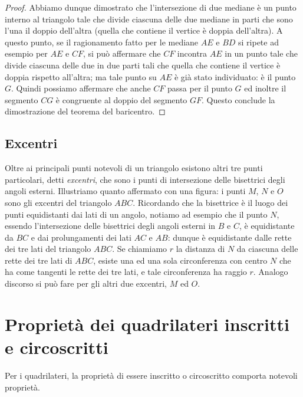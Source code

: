 \begin{proof}
Abbiamo dunque dimostrato che l'intersezione di due mediane è un punto interno al triangolo tale che divide ciascuna delle due mediane in parti che sono l'una il doppio dell'altra (quella che contiene il vertice è doppia dell'altra).
A questo punto, se il ragionamento fatto per le mediane $AE$ e $BD$ si ripete ad esempio per $AE$ e $CF$, si può affermare che $CF$ incontra $AE$ in un punto tale che divide ciascuna delle due in due parti tali che quella che contiene il vertice è doppia rispetto all'altra; ma tale punto su $AE$ è già stato individuato: è il punto $G$. Quindi possiamo affermare che anche $CF$ passa per il punto $G$ ed inoltre il segmento $CG$ è congruente al doppio del segmento $GF$. Questo conclude la dimostrazione del teorema del baricentro.
\end{proof}

\subsection{Excentri}

Oltre ai principali punti notevoli di un triangolo esistono altri tre punti particolari, detti \emph{excentri}, che sono i punti di intersezione delle bisettrici degli angoli esterni. Illustriamo quanto affermato con una figura: i punti $M$, $N$ e $O$ sono gli excentri del triangolo $ABC$. Ricordando che la bisettrice è il luogo dei punti equidistanti dai lati di un angolo, notiamo ad esempio che il punto $N$, essendo l'intersezione delle bisettrici degli angoli esterni in $B$ e $C$, è equidistante da $BC$ e dai prolungamenti dei lati $AC$ e $AB$: dunque è equidistante dalle rette dei tre lati del triangolo $ABC$. Se chiamiamo $r$ la distanza di $N$ da ciascuna delle rette dei tre lati di $ABC$, esiste una ed una sola circonferenza con centro $N$ che ha come tangenti le rette dei tre lati, e tale circonferenza ha raggio $r$. Analogo discorso si può fare per gli altri due excentri, $M$ ed $O$.

\begin{figure}[htb]
	\centering
\end{figure}


\section{Proprietà dei quadrilateri inscritti e circoscritti}\label{sect:quadrilateri_circonferenza}

Per i quadrilateri, la proprietà di essere inscritto o circoscritto comporta notevoli proprietà.


